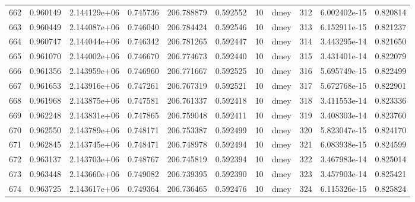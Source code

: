 \begin{tabular}{lrrrrrrlrrr}
662  &    0.960149 &        2.144129e+06 &  0.745736 &              206.788879 &    0.592552 &      10 &         dmey &    312 &   6.002402e-15 &      0.820814 \\
663  &    0.960449 &        2.144087e+06 &  0.746040 &              206.784424 &    0.592546 &      10 &         dmey &    313 &   6.152911e-15 &      0.821237 \\
664  &    0.960747 &        2.144044e+06 &  0.746342 &              206.781265 &    0.592447 &      10 &         dmey &    314 &   3.443295e-14 &      0.821650 \\
665  &    0.961070 &        2.144002e+06 &  0.746670 &              206.774673 &    0.592440 &      10 &         dmey &    315 &   3.431401e-14 &      0.822079 \\
666  &    0.961356 &        2.143959e+06 &  0.746960 &              206.771667 &    0.592525 &      10 &         dmey &    316 &   5.695749e-15 &      0.822499 \\
667  &    0.961653 &        2.143916e+06 &  0.747261 &              206.767319 &    0.592521 &      10 &         dmey &    317 &   5.672768e-15 &      0.822901 \\
668  &    0.961968 &        2.143875e+06 &  0.747581 &              206.761337 &    0.592418 &      10 &         dmey &    318 &   3.411553e-14 &      0.823336 \\
669  &    0.962248 &        2.143831e+06 &  0.747865 &              206.759048 &    0.592411 &      10 &         dmey &    319 &   3.408303e-14 &      0.823760 \\
670  &    0.962550 &        2.143789e+06 &  0.748171 &              206.753387 &    0.592499 &      10 &         dmey &    320 &   5.823047e-15 &      0.824170 \\
671  &    0.962845 &        2.143745e+06 &  0.748471 &              206.748978 &    0.592494 &      10 &         dmey &    321 &   6.083938e-15 &      0.824599 \\
672  &    0.963137 &        2.143703e+06 &  0.748767 &              206.745819 &    0.592394 &      10 &         dmey &    322 &   3.467983e-14 &      0.825014 \\
673  &    0.963448 &        2.143660e+06 &  0.749082 &              206.739395 &    0.592390 &      10 &         dmey &    323 &   3.457903e-14 &      0.825421 \\
674  &    0.963725 &        2.143617e+06 &  0.749364 &              206.736465 &    0.592476 &      10 &         dmey &    324 &   6.115326e-15 &      0.825824 \\

\end{tabular}
